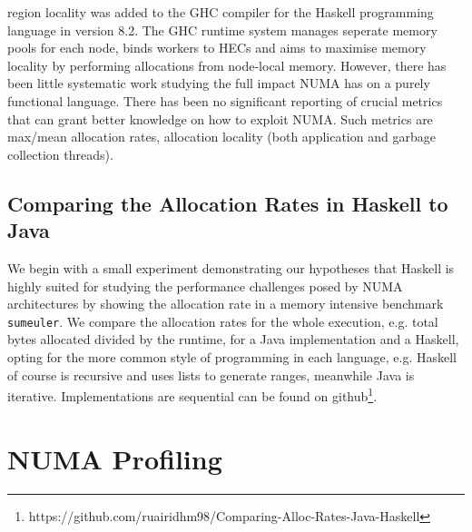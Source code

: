 \documentclass{paper}\usepackage{graphicx}
\begin{document}
region locality was added to the GHC compiler for the Haskell programming language in version 8.2. The GHC runtime system manages seperate memory pools for each node, binds workers to HECs and aims to maximise memory locality by performing allocations from node-local memory. However, there has been little systematic work studying the full impact NUMA has on a purely functional language. There has been no significant reporting of crucial metrics that can grant better knowledge on how to exploit NUMA. Such metrics are max/mean allocation rates, allocation locality (both application and garbage collection threads).

\subsection{Comparing the Allocation Rates in Haskell to Java}
\label{sec:allocrates}

We begin with a small experiment demonstrating our hypotheses that Haskell is highly suited for studying the performance challenges posed by NUMA architectures by showing the allocation rate in a memory intensive benchmark \lstinline{sumeuler}. We compare the allocation rates for the whole execution, e.g. total bytes allocated divided by the runtime, for a Java implementation and a Haskell, opting for the more common style of programming in each language, e.g. Haskell of course is recursive and uses lists to generate ranges, meanwhile Java is iterative. Implementations are sequential can be found on github\footnote{https://github.com/ruairidhm98/Comparing-Alloc-Rates-Java-Haskell}.

\begin{table}[h]
  \centering
  \caption{Comparing the allocation rates for a sequential \lstinline{sumeuler} in both Haskell \& Java.}
  \label{table:baseline}
\end{table}

\section{NUMA Profiling}
\label{sec:profiling_tools}
\end{document}
